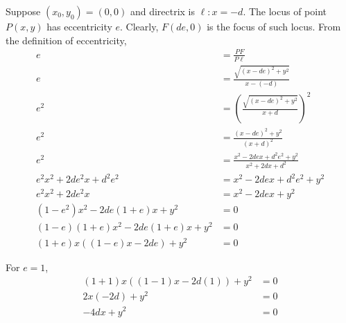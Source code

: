 \documentclass[a4paper]{article}
\begin{document}
Suppose \((x_0,y_0)=(0,0)\) and directrix is \(\ell:x=-d\).
The locus of point \(P(x,y)\) has eccentricity \(e\). Clearly, \(F(de,0)\) is the focus of such locus. From the definition of eccentricity,
\[\begin{aligned}
    e&=\frac{PF}{P\ell}\\
    e&=\frac{\sqrt{(x-de)^2+y^2}}{x-(-d)}\\
    e^2&=\left(\frac{\sqrt{(x-de)^2+y^2}}{x+d}\right)^2\\
    e^2&=\frac{(x-de)^2+y^2}{(x+d)^2}\\
    e^2&=\frac{x^2-2dex+d^2e^2+y^2}{x^2+2dx+d^2}\\
    e^2x^2+2de^2x+d^2e^2&=x^2-2dex+d^2e^2+y^2\\
    e^2x^2+2de^2x&=x^2-2dex+y^2\\
    \left(1-e^2\right)x^2-2de(1+e)x+y^2&=0\\
    (1-e)(1+e)x^2-2de(1+e)x+y^2&=0\\
    (1+e)x((1-e)x-2de)+y^2&=0
\end{aligned}\]

For \(e=1\),
\[\begin{aligned}
    (1+1)x((1-1)x-2d(1))+y^2&=0\\
    2x(-2d)+y^2&=0\\
    -4dx+y^2&=0\\
\end{aligned}\]
\end{document}
